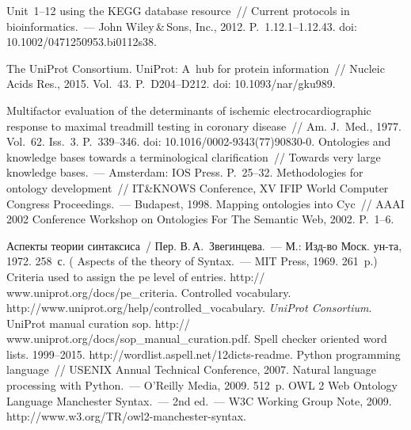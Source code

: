 \begin{multicols}{2}
{{\begin{thebibliography}{99}
 Unit~1--12 using the KEGG database resource~// Current protocols in 
bioinformatics.~--- John Wiley\,\&\,Sons, Inc., 2012. P.~1.12.1--1.12.43.  doi: 10.1002/0471250953.bi0112s38.

The UniProt Consortium. UniProt: A~hub for protein information~// Nucleic Acids Res., 
2015.  Vol.~43. P.~D204--D212. doi: 10.1093/nar/gku989.

 Multifactor evaluation of the determinants of ischemic electrocardiographic 
response to maximal treadmill testing in coronary disease~// Am. J.~Med., 1977. Vol.~62. 
Iss.~3. P.~339--346. doi: 10.1016/0002-9343(77)90830-0.
 Ontologies and knowledge bases towards a terminological 
clarification~// Towards very large knowledge bases.~--- Amsterdam: IOS Press.  
P.~25--32.
 Methodologies for ontology development~//  
IT\&KNOWS Conference, XV IFIP World Computer Congress Proceedings.~--- Budapest, 
1998.
 Mapping ontologies into Cyc~// AAAI 2002 Conference Workshop 
on Ontologies For The Semantic Web, 2002. P.~1--6.

\columnbreak


 Аспекты теории синтаксиса~/ Пер. В.\,А.~Звегинцева.~--- М.: Изд-во Моск. 
ун-та, 1972.  258~с. ( {Aspects of the theory of Syntax}.~---  MIT Press, 
1969. 261~p.)
Criteria used to assign the pe level of entries. {\sf http:// www.uniprot.org/docs/pe\_criteria}.
Controlled vocabulary. {\sf http://www.uniprot.org/help/\linebreak controlled\_vocabulary}.
\textit{UniProt Consortium}. UniProt manual curation sop. {\sf 
http:// www.uniprot.org/docs/sop\_manual\_curation.pdf}.
 Spell checker oriented word lists. 1999--2015. 
{\sf http://wordlist.aspell.net/12dicts-readme}.
 Python programming language~// USENIX Annual Technical 
Conference, 2007.
 Natural language processing with Python.~--- O'Reilly Media, 
2009. 512~p.
 OWL 2 Web Ontology Language Manchester  
Syntax.~--- 2nd ed.~--- W3C Working Group Note, 2009. 
{\sf http://www.w3.org/TR/owl2-manchester-syntax}.
\end{thebibliography}

 }
 }

\end{multicols}

